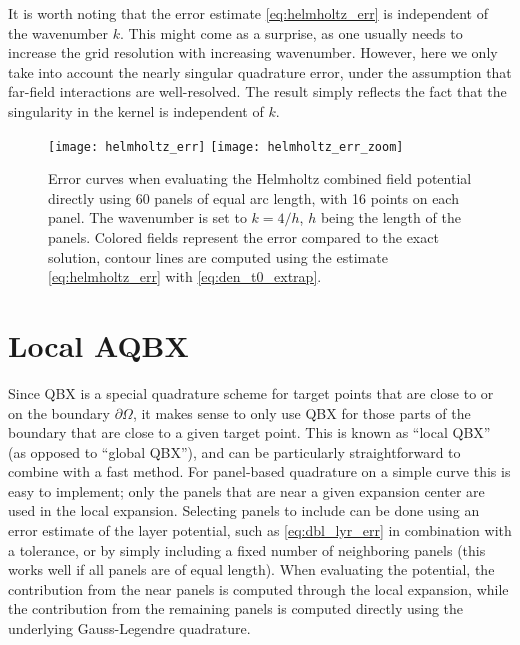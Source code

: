 \documentclass[hidelinks]{siamart1116}
\begin{document}
It is worth noting that the error estimate \eqref{eq:helmholtz_err} is
independent of the wavenumber $k$. This might come as a surprise, as
one usually needs to increase the grid resolution with increasing
wavenumber. However, here we only take into account the nearly
singular quadrature error, under the assumption that far-field
interactions are well-resolved. The result simply reflects the fact
that the singularity in the kernel is independent of $k$.

\begin{figure}[htbp]
  \centering
  
  \texttt{[image: helmholtz\_err]}
  \texttt{[image: helmholtz\_err\_zoom]}
  \caption{Error curves when evaluating the Helmholtz combined field
    potential directly using 60 panels of equal arc length, with 16
    points on each panel. The wavenumber is set to $k=4/h$, $h$ being
    the length of the panels. Colored fields represent the error
    compared to the exact solution, contour lines are computed using
    the estimate \eqref{eq:helmholtz_err} with
    \eqref{eq:den_t0_extrap}.  }
  \label{fig:helmholtz_err}
\end{figure}

\section{Local AQBX}
\label{sec:local-aqbx}

Since QBX is a special quadrature scheme for target points that are
close to or on the boundary ${{\partial\Omega}}$, it makes sense to only use QBX
for those parts of the boundary that are close to a given target
point. This is known as ``local QBX'' \cite{Rachh2015a} (as opposed to
``global QBX''), and can be particularly straightforward to combine
with a fast method. For panel-based quadrature on a simple curve this
is easy to implement; only the panels that are near a given expansion
center are used in the local expansion. Selecting panels to include
can be done using an error estimate of the layer potential, such as
\eqref{eq:dbl_lyr_err} in combination with a tolerance, or by simply
including a fixed number of neighboring panels (this works well if all
panels are of equal length). When evaluating the potential, the
contribution from the near panels is computed through the local
expansion, while the contribution from the remaining panels is
computed directly using the underlying Gauss-Legendre quadrature.
\end{document}
